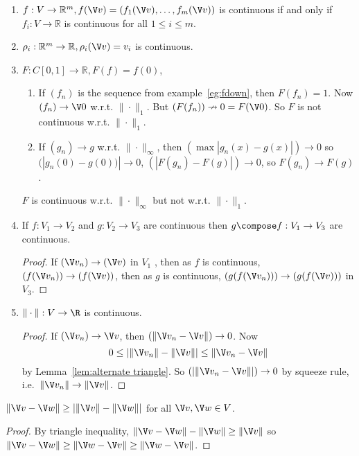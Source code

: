 \documentclass[a4paper]{article}
\theoremstyle{definition}
\begin{document}
\begin{eg}\leavevmode
  \label{eg:continuity}
  \begin{enumerate}
  \item $f:V\to \mathbb{R}^m, f(\V v) = (f_1(\V v), \ldots, f_m(\V v))$ is continuous if and only if $f_i:V\to \mathbb{R}$ is continuous for all $1\leq i \leq m$.
  \item $\rho_i:\mathbb{R}^m\to \mathbb{R}, \rho_i(\V v) =v_i$ is continuous.
  \item $F:C[0,1]\to\mathbb{R}, F(f)=f(0)$,
    \begin{enumerate}
    \item If $(f_n)$ is the sequence from example~\ref{eg:fdown}, then $F(f_n)=1$. Now $(f_n)\to \V 0$ w.r.t. $\|\cdot\|_1$. But $(F(f_n))\nrightarrow 0=F(\V 0)$. So $F$ is not continuous w.r.t. $\|\cdot\|_1$.
      \item If $(g_n)\to g$ w.r.t. $\|\cdot\|_\infty$, then $(\max|g_n(x)-g(x)|)\to 0$ so $(|g_n(0)-g(0))|\to 0$, $(|F(g_n)-F(g)|)\to 0$, so $F(g_n)\to F(g)$.
    \end{enumerate}
    $F$ is continuous w.r.t. $\|\cdot\|_\infty$ but not w.r.t. $\|\cdot\|_1$.
  \item If $f:V_1\to V_2$ and $g:V_2\to V_3$ are continuous then $g\compose f: V_1\to V_3$ are continuous.
    \begin{proof}
      If $(\V v_n) \to (\V v)$ in $V_1$ , then as $f$ is continuous, $(f(\V v_n)) \to (f(\V v))$, then as $g$ is continuous, $(g(f(\V v_n))) \to (g(f(\V v)))$ in $V_3$.
    \end{proof}
  \item $\|\cdot\|: V \to \R$ is continuous.
    \begin{proof}
      If $(\V v_n)\to \V v$, then $(\|\V v_n - \V v\|) \to 0$. Now
    \[
      0 \leq |\|\V v_n\| - \|\V v\|| \leq \|\V v_n - \V v\|
    \]
    by Lemma~\ref{lem:alternate triangle}. So $(|\|\V v_n - \V v\||) \to 0$ by squeeze rule, i.e.\ $\|\V v_n\| \to \|\V v\|$.
  \end{proof}
  \end{enumerate}
\end{eg}

\begin{lemma}
  \label{lem:alternate triangle}
  $\|\V v- \V w\| \geq |\|\V v\| - \|\V w\||$ for all $\V v, \V w \in V$.
\end{lemma}

\begin{proof}
  By triangle inequality, $\|\V v- \V w\| - \|\V w\| \geq \|\V v \|$ so $\|\V v - \V w\| \geq \|\V w - \V v\| \geq \|\V w - \V v\|$.
\end{proof}
\end{document}
